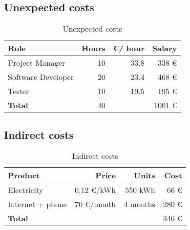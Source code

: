 \subsection{Unexpected costs}
\begin{frame}{\insertsubsec}
  \begin{table}[H]
    \centering
    \begin{tabular}{|l|r|r|r|}
      \hline
      \textbf{Role} & \textbf{Hours} & \textbf{\euro / hour} & \textbf{Salary} \\ \hline\hline
      Project Manager & 10 & 33.8 & 338 \euro \\ \hline
      Software Developer & 20 & 23.4 & 468 \euro \\ \hline
      Tester & 10 & 19.5 & 195 \euro \\ \hline
  
      \hline\hline
      \textbf{Total} & 40 & & 1001 \euro \\ 
      \hline
    \end{tabular}
    \caption{Unexpected costs \label{tab:unexpected-costs}}
  \end{table}
\end{frame}

\subsection{Indirect costs}
\begin{frame}{\insertsubsec}
  \begin{table}[H]
    \centering
    \begin{tabular}{|l|r|r|r|}
      \hline
      \textbf{Product} & \textbf{Price} & \textbf{Units} & \textbf{Cost} \\ \hline\hline
  
      Electricity & 0,12 \euro/kWh & 550 kWh & 66 \euro \\ \hline
      Internet + phone & 70 \euro/month & 4 months & 280 \euro \\ \hline
      
      \hline\hline
      \textbf{Total} & & & 346 \euro \\ \hline
    \end{tabular}
    \caption{Indirect costs \label{tab:indirect-costs}}
  \end{table}
\end{frame}

